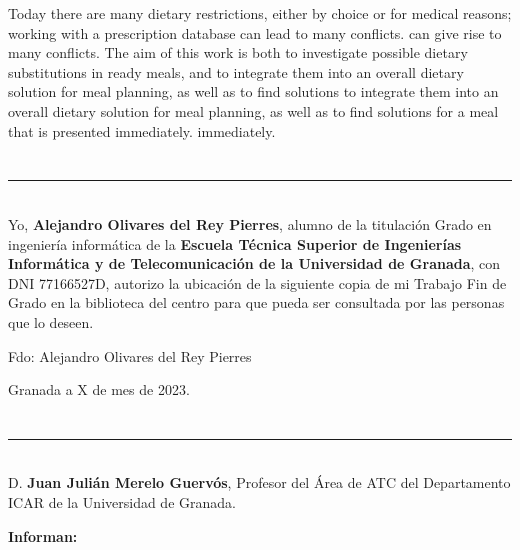 Today there are many dietary restrictions, either by choice or for medical reasons; working with a prescription database can lead to many conflicts.
can give rise to many conflicts. The aim of this work is both to investigate possible dietary substitutions in ready meals, and to integrate them into an overall dietary solution for meal planning, as well as to find solutions to
integrate them into an overall dietary solution for meal planning, as well as to find solutions for a meal that is presented immediately.
immediately.

\chapter*{}
\thispagestyle{empty}

\noindent\rule[-1ex]{\textwidth}{2pt}\\[4.5ex]

Yo, \textbf{Alejandro Olivares del Rey Pierres}, alumno de la titulación Grado en ingeniería informática de la \textbf{Escuela Técnica Superior
de Ingenierías Informática y de Telecomunicación de la Universidad de Granada}, con DNI 77166527D, autorizo la
ubicación de la siguiente copia de mi Trabajo Fin de Grado en la biblioteca del centro para que pueda ser
consultada por las personas que lo deseen.

\vspace{6cm}

\noindent Fdo: Alejandro Olivares del Rey Pierres

\vspace{2cm}

\begin{flushright}
Granada a X de mes de 2023.
\end{flushright}


\chapter*{}
\thispagestyle{empty}

\noindent\rule[-1ex]{\textwidth}{2pt}\\[4.5ex]

D. \textbf{Juan Julián Merelo Guervós}, Profesor del Área de ATC del Departamento ICAR de la Universidad de Granada.

\vspace{0.5cm}

\textbf{Informan:}

\vspace{0.5cm}


